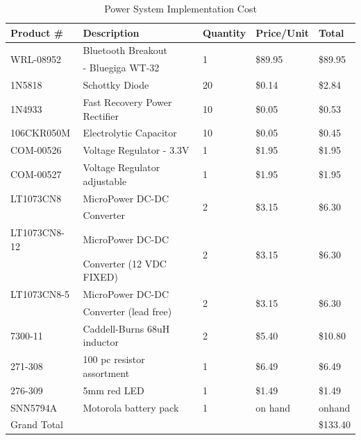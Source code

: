 \begin{table}[bhp]
\caption[Implementation Cost]{Power System Implementation%
Cost\cite{web:caddell-burns-price} \cite{web:wt32-price} \cite{web:resistor-price} \cite{web:cap-price}}
\small
\centering
\begin{tabular}{l|l|l|l|l}
\setlength{\tabcolsep}{1pt}
Product \# & Description & Quantity & Price/Unit & Total \\\hline
\multirow{2}{*}{WRL-08952}  & Bluetooth Breakout & \multirow{2}{*}{1} & \multirow{2}{*}{\$89.95} & \multirow{2}{*}{\$89.95} \\
		   & - Bluegiga WT-32  &          &   &     \\

    1N5818 & Schottky Diode &         20 &     \$0.14 &     \$2.84 \\

    1N4933 & Fast Recovery Power Rectifier &         10 &     \$0.05 &     \$0.53 \\

106CKR050M & Electrolytic Capacitor &         10 &     \$0.05 &     \$0.45 \\

COM-00526  & Voltage Regulator - 3.3V  &          1 &     \$1.95 &     \$1.95 \\

COM-00527  & Voltage Regulator adjustable &          1 &     \$1.95 &     \$1.95 \\

LT1073CN8  & MicroPower DC-DC 		 & \multirow{2}{*}{2} & \multirow{2}{*}{\$3.15} & \multirow{2}{*}{\$6.30} \\
			 &	Converter  &          &      &      \\
LT1073CN8-12  & MicroPower DC-DC 		 & \multirow{2}{*}{2} & \multirow{2}{*}{\$3.15} & \multirow{2}{*}{\$6.30} \\
			 &	Converter (12 VDC FIXED) &          &      &      \\
LT1073CN8-5  & MicroPower DC-DC 		 & \multirow{2}{*}{2} & \multirow{2}{*}{\$3.15} & \multirow{2}{*}{\$6.30} \\
			 & Converter (lead free) &           &   &  \\

   7300-11 & Caddell-Burns 68uH inductor &          2 &     \$5.40 &    \$10.80 \\
   271-308  & 100 pc resistor assortment & 					1 &			\$6.49 &    \$6.49 \\
   276-309  & 5mm red LED								 &					1 &			\$1.49 &    \$1.49 \\
   SNN5794A & Motorola battery pack			 &					1	&			on hand&    onhand \\
Grand Total & & & & \$133.40\\
\end{tabular}   
\label{tab:power_imp_cost_est}
\end{table}

